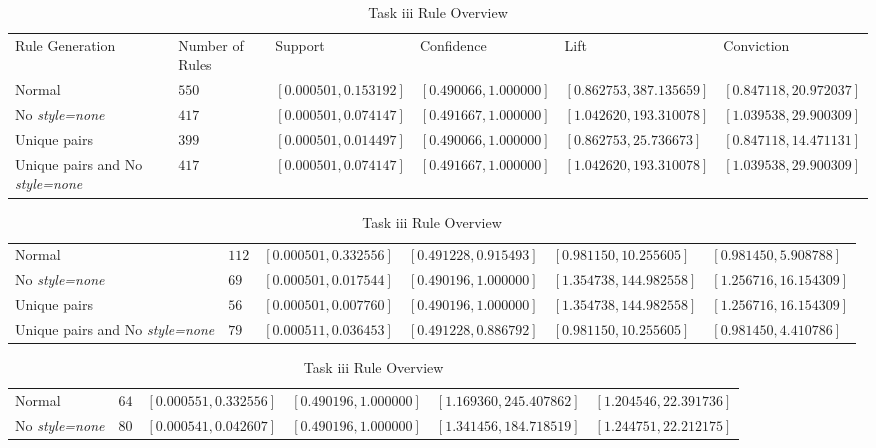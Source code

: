 \documentclass[letterpaper,10pt]{article}
\begin{document}
\begin{table}[h]
\centering
\caption{Task iii Rule Overview}
\label{tb:t3ro}
\begin{adjustbox}{max width=\textwidth}
\begin{tabular}{llllll}
Rule Generation & Number of Rules & Support & Confidence & Lift & Conviction \\
Normal & $550$ & $[0.000501,0.153192]$ & $[0.490066,1.000000]$ & $[0.862753,387.135659]$ & $[0.847118,20.972037]$ \\
No \textit{style=none} & $417$ & $[0.000501,0.074147]$ & $[0.491667,1.000000]$ & $[1.042620,193.310078]$ & $[1.039538,29.900309]$ \\
Unique pairs  & $399$ & $[0.000501,0.014497]$ & $[0.490066,1.000000]$ & $[0.862753,25.736673]$ & $[0.847118,14.471131]$ \\
Unique pairs and No \textit{style=none} & $417$ & $[0.000501,0.074147]$ & $[0.491667,1.000000]$ & $[1.042620,193.310078]$ & $[1.039538,29.900309]$ \\
\end{tabular}
\end{adjustbox}
\begin{adjustbox}{max width=\textwidth}
\begin{tabular}{llllll}
Normal& $112$ & $[0.000501,0.332556]$ & $[0.491228,0.915493]$ & $[0.981150,10.255605]$ & $[0.981450,5.908788]$ \\
No \textit{style=none} & $69$ & $[0.000501,0.017544]$ & $[0.490196,1.000000]$ & $[1.354738,144.982558]$ & $[1.256716,16.154309]$ \\
Unique pairs & $56$ & $[0.000501,0.007760]$ & $[0.490196,1.000000]$ & $[1.354738,144.982558]$ & $[1.256716,16.154309]$ \\
Unique pairs and No \textit{style=none}& $79$ & $[0.000511,0.036453]$ & $[0.491228,0.886792]$ & $[0.981150,10.255605]$ & $[0.981450,4.410786]$ \\
\end{tabular}
\end{adjustbox}
\begin{adjustbox}{max width=\textwidth}
\begin{tabular}{llllll}
Normal & $64$ & $[0.000551,0.332556]$ & $[0.490196,1.000000]$ & $[1.169360,245.407862]$ & $[1.204546,22.391736]$ \\
No \textit{style=none} & $80$ & $[0.000541,0.042607]$ & $[0.490196,1.000000]$ & $[1.341456,184.718519]$ & $[1.244751,22.212175]$ \\

\end{tabular}
\end{adjustbox}
\end{table}
\end{document}
